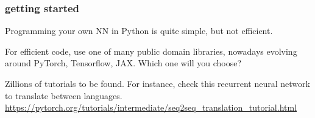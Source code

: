 \documentclass[USenglish,pdftex,compress,10pt,svgnamesi,handout]{beamer}
\begin{document}
\begin{frame}
\frametitle{getting started}

Programming your own NN in Python is quite simple, but not efficient. 

For efficient code, use one of many public domain libraries, nowadays evolving around PyTorch, Tensorflow, JAX.  Which one will you choose?


Zillions of tutorials to be found.  For instance, check this recurrent neural network to translate between languages. \url{https://pytorch.org/tutorials/intermediate/seq2seq_translation_tutorial.html}

\end{frame}




%
%
%
\end{document}
